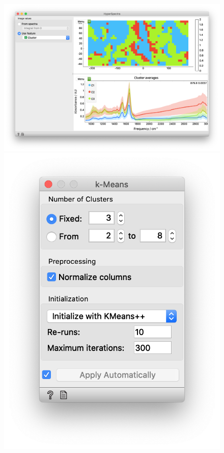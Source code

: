 \begin{figure}[h]
\vspace{-0.5cm}
\hspace{-1cm}
  {\includegraphics[scale=0.33]{graphics/ch-spectra_image_clustering/sp_image_clustering-fig2b.png}}
  {\includegraphics[scale=0.55]{graphics/ch-spectra_image_clustering/sp_image_clustering-fig2a.png}}
  \label{ffig:spectra_image_clustering-fig2}
\end{figure}



